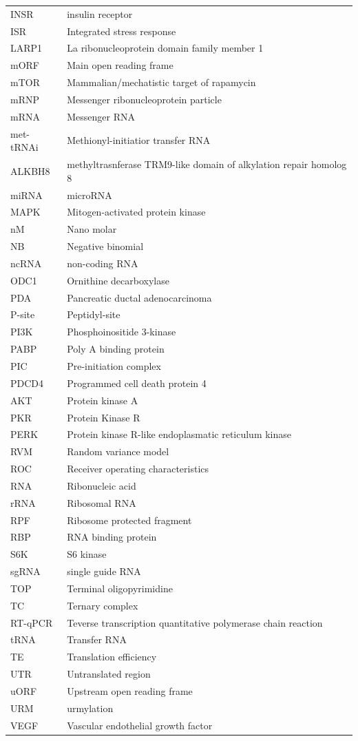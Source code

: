 \documentclass[12pt,openany]{book}
\begin{document}
\begin{longtable}{ll}
INSR & insulin receptor\\
\addlinespace
ISR & Integrated stress response\\
LARP1 & La ribonucleoprotein domain family member 1\\
mORF & Main open reading frame\\
mTOR & Mammalian/mechatistic target of rapamycin\\
mRNP & Messenger ribonucleoprotein particle\\
\addlinespace
mRNA & Messenger RNA\\
met-tRNAi & Methionyl-initiatior transfer RNA\\
ALKBH8 & methyltrasnferase TRM9-like domain of alkylation repair homolog 8\\
miRNA & microRNA\\
MAPK & Mitogen-activated protein
kinase\\
\addlinespace
nM & Nano molar\\
NB & Negative binomial\\
ncRNA & non-coding RNA\\
ODC1 & Ornithine decarboxylase\\
PDA & Pancreatic ductal adenocarcinoma\\
\addlinespace
P-site & Peptidyl-site\\
PI3K & Phosphoinositide 3-kinase\\
PABP & Poly A binding protein\\
PIC & Pre-initiation complex\\
PDCD4 & Programmed cell death protein 4\\
\addlinespace
AKT & Protein kinase A\\
PKR & Protein Kinase R\\
PERK & Protein kinase R-like endoplasmatic reticulum kinase\\
RVM & Random variance model\\
ROC & Receiver operating characteristics\\
\addlinespace
RNA & Ribonucleic acid\\
rRNA & Ribosomal RNA\\
RPF & Ribosome protected fragment\\
RBP & RNA binding protein\\
S6K & S6 kinase\\
\addlinespace
sgRNA & single guide RNA\\
TOP & Terminal oligopyrimidine\\
TC & Ternary complex\\
RT-qPCR & Teverse transcription quantitative polymerase chain
reaction\\
tRNA & Transfer RNA\\
\addlinespace
TE & Translation efficiency\\
UTR & Untranslated region\\
uORF & Upstream open reading frame\\
URM & urmylation\\
VEGF & Vascular endothelial growth factor\\*
\end{longtable}
\end{document}
